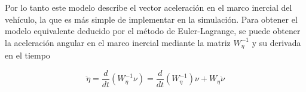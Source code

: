 \documentclass[\main/main.tex]{subfiles}
\begin{document}
Por lo tanto este modelo describe el vector aceleración en el marco
inercial del vehículo, la que es más simple de implementar en la simulación.
Para obtener el modelo equivalente deducido por el método de Euler-Lagrange,
se puede obtener la aceleración angular en el marco inercial mediante
la matriz $W_{\eta}^{-1}$ y su derivada en el tiempo 

\begin{equation}
\ddot{\eta}=\frac{d}{dt}(W_{\eta}^{-1}\nu)=\frac{d}{dt}(W_{\eta}^{-1})\nu+W_{\eta}\dot{\nu}
\end{equation}

\textcompwordmark{}
\end{document}

